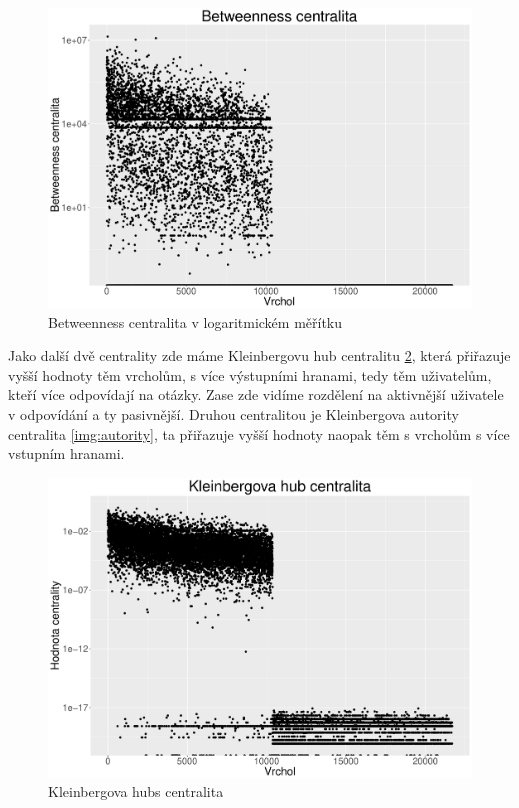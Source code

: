 \documentclass[a4paper,12pt]{article}
\begin{document}
\begin{figure}[h!]
\centering
\includegraphics[scale=0.4]{images/betweenness_log.pdf}
\caption{Betweenness centralita v logaritmickém měřítku}
\label{img:bc_log}
\end{figure}

Jako další dvě centrality zde máme Kleinbergovu hub centralitu \ref{img:hubs}, která přiřazuje
vyšší hodnoty těm vrcholům, s více výstupními hranami, tedy těm uživatelům, kteří více odpovídají
na otázky. Zase zde vidíme rozdělení na aktivnější uživatele v odpovídání a ty pasivnější. 
Druhou centralitou je Kleinbergova autority centralita \ref{img:autority}, ta přiřazuje vyšší hodnoty
naopak těm s vrcholům s více vstupním hranami.

\begin{figure}[h!]
\centering
\includegraphics[scale=0.4]{images/hubs.pdf}
\caption{Kleinbergova hubs centralita}
\label{img:hubs}
\end{figure}
\end{document}
